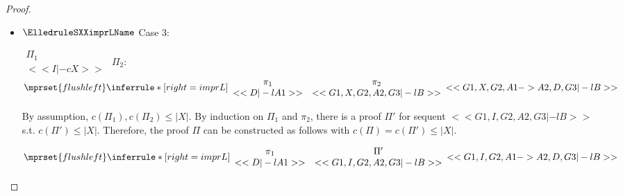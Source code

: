 \begin{proof}
\begin{enumerate}
\begin{itemize}
  \item $\ElledruleSXXimprLName$ Case 3:
      \begin{center}
        \scriptsize
        \begin{math}
          \begin{array}{c}
            \Pi_1 \\
            {<<I |-c X>>}
          \end{array}
        \end{math}
        \qquad\qquad
        $\Pi_2$:
        \begin{math}
          $$\mprset{flushleft}
          \inferrule* [right={\tiny imprL}] {
            {
              \begin{array}{cc}
                \pi_1 & \pi_2 \\
                {<<D |-l A1>>} & {<<G1, X, G2, A2, G3 |-l B>>}
              \end{array}
            }
          }{<<G1, X, G2, A1 -> A2, D, G3 |-l B>>}
        \end{math}
      \end{center}
      By assumption, $c(\Pi_1),c(\Pi_2)\leq |X|$. By induction on $\Pi_1$ and $\pi_2$, there is
      a proof $\Pi'$ for sequent $<<G1, I, G2, A2, G3 |-l B>>$ s.t. $c(\Pi') \leq |X|$.
      Therefore, the proof $\Pi$ can be constructed as follows with
      $c(\Pi) = c(\Pi') \leq |X|$.
      \begin{center}
        \scriptsize
        \begin{math}
          $$\mprset{flushleft}
          \inferrule* [right={\tiny imprL}] {
            {
              \begin{array}{cc}
                \pi_1 & \Pi' \\
                {<<D |-l A1>>} & {<<G1, I, G2, A2, G3 |-l B>>}
              \end{array}
            }
          }{<<G1, I, G2, A1 -> A2, D, G3 |-l B>>}
        \end{math}
      \end{center}


\end{itemize}
\end{enumerate}
\end{proof}
